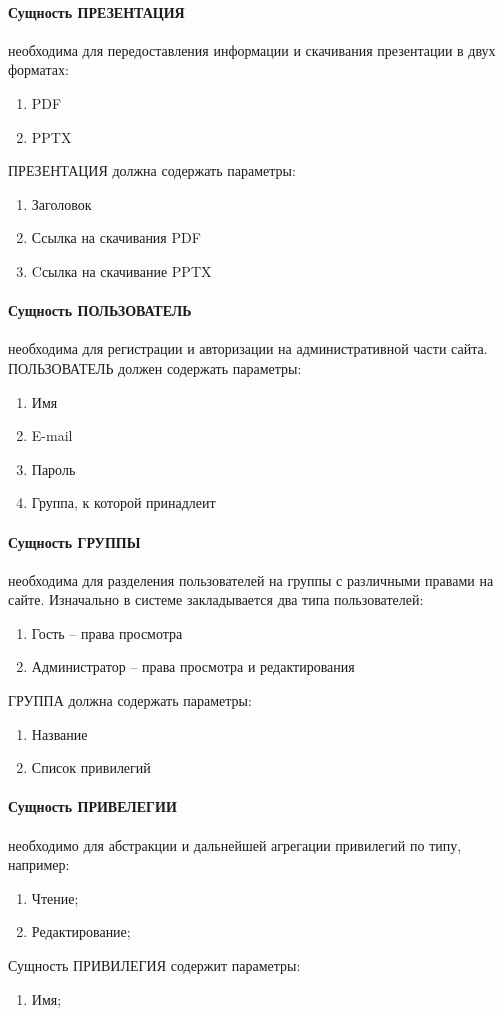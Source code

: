 \paragraph{Сущность ПРЕЗЕНТАЦИЯ} необходима для передоставления информации и скачивания презентации в двух форматах:
\begin{enumerate}
  \item PDF
  \item PPTX
\end{enumerate}
ПРЕЗЕНТАЦИЯ должна содержать параметры:
\begin{enumerate}
  \item Заголовок
  \item Ссылка на скачивания PDF
  \item Cсылка на скачивание PPTX
\end{enumerate}

\paragraph{Сущность ПОЛЬЗОВАТЕЛЬ} необходима для регистрации и авторизации на административной части сайта.
ПОЛЬЗОВАТЕЛЬ должен содержать параметры:
\begin{enumerate}
  \item Имя
  \item E-mail
  \item Пароль
  \item Группа, к которой принадлеит
\end{enumerate}

\paragraph{Сущность ГРУППЫ} необходима для разделения пользователей на группы с различными правами на сайте. Изначально в системе закладывается два типа пользователей:
\begin{enumerate}
  \item Гость -- права просмотра
  \item Администратор -- права просмотра и редактирования
\end{enumerate}
ГРУППА должна содержать параметры:
\begin{enumerate}
  \item Название
  \item Список привилегий
\end{enumerate}

\paragraph{Сущность ПРИВЕЛЕГИИ} необходимо для абстракции и дальнейшей агрегации привилегий по типу, например:
\begin{enumerate}
  \item Чтение;
  \item Редактирование;
\end{enumerate}
Сущность ПРИВИЛЕГИЯ содержит параметры:
\begin{enumerate}
  \item Имя;
\end{enumerate}

